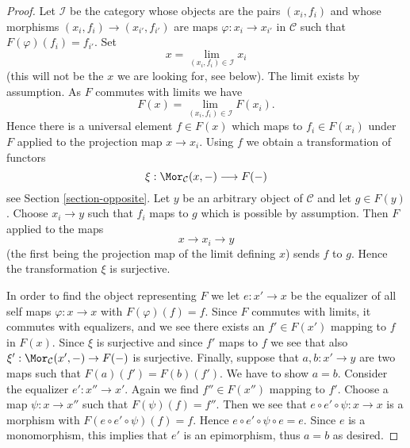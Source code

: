 \begin{proof}
Let $\mathcal{I}$ be the category whose objects are the pairs $(x_i, f_i)$
and whose morphisms $(x_i, f_i) \to (x_{i'}, f_{i'})$ are maps
$\varphi : x_i \to x_{i'}$ in $\mathcal{C}$
such that $F(\varphi)(f_i) = f_{i'}$. Set
$$
x = \lim_{(x_i, f_i) \in \mathcal{I}} x_i
$$
(this will not be the $x$ we are looking for, see below).
The limit exists by assumption. As $F$ commutes with limits
we have
$$
F(x) = \lim_{(x_i, f_i) \in \mathcal{I}} F(x_i).
$$
Hence there is a universal element $f \in F(x)$ which maps to $f_i \in F(x_i)$
under $F$ applied to the projection map $x \to x_i$.
Using $f$ we obtain a transformation of functors
$$
\xi : \Mor_\mathcal{C}(x, - ) \longrightarrow F(-)
$$
see Section \ref{section-opposite}. Let $y$ be an arbitrary object of
$\mathcal{C}$ and let $g \in F(y)$. Choose $x_i \to y$ such that $f_i$
maps to $g$ which is possible by assumption. Then $F$ applied to the maps
$$
x \longrightarrow x_i \longrightarrow y
$$
(the first being the projection map of the limit defining $x$)
sends $f$ to $g$. Hence the transformation $\xi$ is surjective.

\medskip\noindent
In order to find the object representing $F$ we let $e : x' \to x$ be the
equalizer of all self maps $\varphi : x \to x$ with $F(\varphi)(f) = f$.
Since $F$ commutes with limits, it commutes with equalizers, and
we see there exists an $f' \in F(x')$ mapping to $f$ in $F(x)$.
Since $\xi$ is surjective and since $f'$ maps to $f$ we see that
also $\xi' : \Mor_\mathcal{C}(x', -) \to F(-)$ is surjective.
Finally, suppose that $a, b : x' \to y$ are two maps such that
$F(a)(f') = F(b)(f')$. We have to show $a = b$. Consider the equalizer
$e' : x'' \to x'$. Again we find $f'' \in F(x'')$ mapping to $f'$.
Choose a map $\psi : x \to x''$ such that $F(\psi)(f) = f''$.
Then we see that $e \circ e' \circ \psi : x \to x$ is a morphism
with $F(e \circ e' \circ \psi)(f) = f$. Hence
$e \circ e' \circ \psi \circ e = e$. Since $e$ is a monomorphism,
this implies that $e'$ is an epimorphism, thus $a = b$ as desired.
\end{proof}

